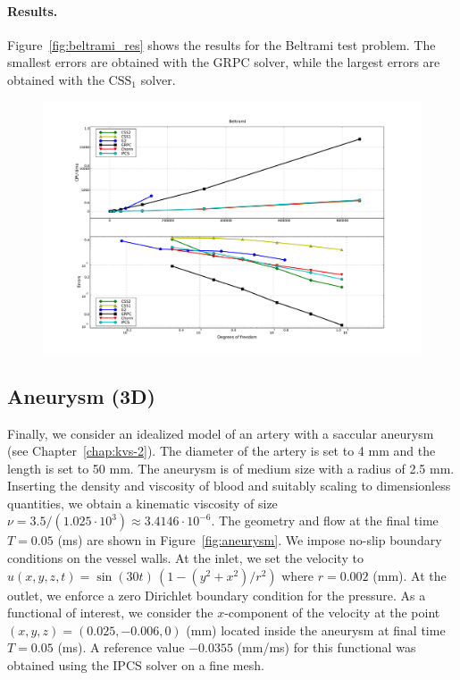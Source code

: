 \paragraph{Results.}

Figure~\ref{fig:beltrami_res} shows the results for the Beltrami test
problem. The smallest errors are obtained with the GRPC solver, while
the largest errors are obtained with the $\mathrm{CSS}_1$ solver.

\begin{figure}
  {\includegraphics[width=\fullfig]{chapters/kvs-1/pdf/new_beltrami_res.pdf}}
\end{figure}

\subsection{Aneurysm (3D)}

Finally, we consider an idealized model of an artery with a saccular
aneurysm (see Chapter~\ref{chap:kvs-2}). The diameter of the artery is
set to 4 mm and the length is set to 50 mm. The aneurysm is of medium
size with a radius of 2.5 mm. Inserting the density and viscosity of
blood and suitably scaling to dimensionless quantities, we obtain a
kinematic viscosity of size $\nu = 3.5 / (1.025 \cdot 10^3) \approx
3.4146 \cdot 10^{-6}$. The geometry and flow at the final time $T =
0.05$ (ms) are shown in Figure~\ref{fig:aneurysm}. We impose no-slip
boundary conditions on the vessel walls. At the inlet, we set the
velocity to $u(x, y, z, t) = \sin(30 t) \, (1 - (y^2 + x^2) / r^2)$
where $r = 0.002$ (mm). At the outlet, we enforce a zero Dirichlet
boundary condition for the pressure. As a functional of interest, we
consider the $x$-component of the velocity at the point $(x, y, z) =
(0.025, -0.006, 0)$ (mm) located inside the aneurysm at final time $T
= 0.05$ (ms). A reference value $-0.0355$ (mm/ms) for this functional
was obtained using the IPCS solver on a fine mesh.

